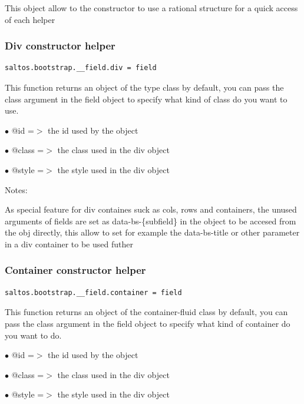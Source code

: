 \documentclass[a4paper]{article}
\begin{document}
This object allow to the constructor to use a rational structure for a quick access of each helper

\hypertarget{toc45}{}
\subsubsection{Div constructor helper}

\begin{lstlisting}
saltos.bootstrap.__field.div = field
\end{lstlisting}

This function returns an object of the type class by default, you can pass the class
argument in the field object to specify what kind of class do you want to use.

\begin{compactitem}
\item[\color{myblue}$\bullet$] @id    =$>$ the id used by the object
\item[\color{myblue}$\bullet$] @class =$>$ the class used in the div object
\item[\color{myblue}$\bullet$] @style =$>$ the style used in the div object
\end{compactitem}

Notes:

As special feature for div containes suck as cols, rows and containers, the unused arguments of fields
are set as data-bs-\{subfield\} in the object to be accesed from the obj directly, this allow to set for
example the data-bs-title or other parameter in a div container to be used futher

\hypertarget{toc46}{}
\subsubsection{Container constructor helper}

\begin{lstlisting}
saltos.bootstrap.__field.container = field
\end{lstlisting}

This function returns an object of the container-fluid class by default, you can pass the class
argument in the field object to specify what kind of container do you want to do.

\begin{compactitem}
\item[\color{myblue}$\bullet$] @id    =$>$ the id used by the object
\item[\color{myblue}$\bullet$] @class =$>$ the class used in the div object
\item[\color{myblue}$\bullet$] @style =$>$ the style used in the div object
\end{compactitem}
\end{document}
